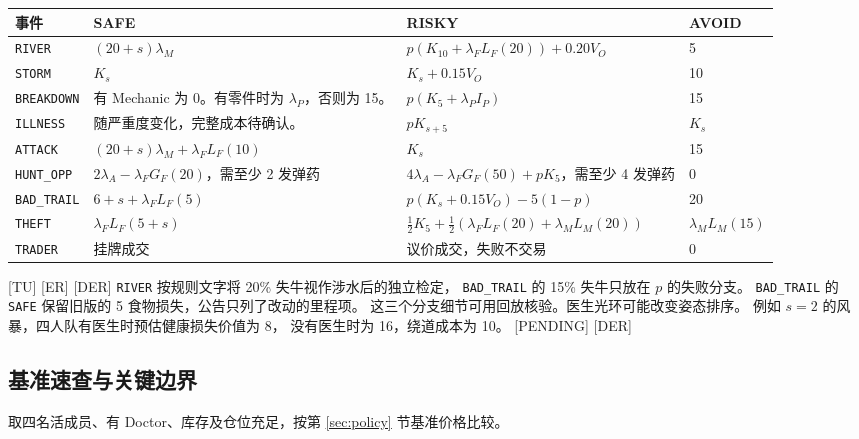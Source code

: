 \documentclass[UTF8,11pt,a4paper]{ctexart}
\newcommand{\src}[1]{\textup{\small\textcolor{muted}{[#1]}}}
\newcommand{\api}[1]{\texttt{#1}}
\newcommand{\hp}[1]{K_{#1}}
\newcommand{\fl}[1]{L_F(#1)}
\newcommand{\ml}[1]{L_M(#1)}
\newcommand{\fg}[1]{G_F(#1)}
\newcommand{\ox}{V_O}
\begin{document}
\begin{center}\small
\begin{tabularx}{\linewidth}{@{}L{2.65cm}Y Y L{2.05cm}@{}}
\toprule
事件 & SAFE & RISKY & AVOID \\
\midrule
\api{RIVER} &
  $(20+s)\lambda_M$ &
  $p(\hp{10}+\lambda_F\fl{20})+0.20\ox$ & 5 \\
\api{STORM} &
  $\hp{s}$ & $\hp{s}+0.15\ox$ & 10 \\
\api{BREAKDOWN} &
  有 Mechanic 为 0。有零件时为 $\lambda_P$，否则为 15。 &
  $p(\hp{5}+\lambda_P I_P)$ & 15 \\
\api{ILLNESS} &
  随严重度变化，完整成本待确认。 & $p\hp{s+5}$ & $\hp{s}$ \\
\api{ATTACK} &
  $(20+s)\lambda_M+\lambda_F\fl{10}$ &
  $\hp{s}$ & 15 \\
\api{HUNT\_OPP} &
  $2\lambda_A-\lambda_F\fg{20}$，需至少 2 发弹药 &
  $4\lambda_A-\lambda_F\fg{50}+p\hp{5}$，需至少 4 发弹药 & 0 \\
\api{BAD\_TRAIL} &
  $6+s+\lambda_F\fl{5}$ &
  $p(\hp{s}+0.15\ox)-5(1-p)$ & 20 \\
\api{THEFT} &
  $\lambda_F\fl{5+s}$ &
  $\tfrac12\hp{5}+\tfrac12(\lambda_F\fl{20}+\lambda_M\ml{20})$ &
  $\lambda_M\ml{15}$ \\
\api{TRADER} & 挂牌成交 & 议价成交，失败不交易 & 0 \\
\bottomrule
\end{tabularx}
\end{center}

\noindent\src{TU} \src{ER} \src{DER}
\api{RIVER} 按规则文字将 20\% 失牛视作涉水后的独立检定，
\api{BAD\_TRAIL} 的 15\% 失牛只放在 $p$ 的失败分支。
\api{BAD\_TRAIL} 的 \api{SAFE} 保留旧版的 5 食物损失，公告只列了改动的里程项。
这三个分支细节可用回放核验。医生光环可能改变姿态排序。
例如 $s=2$ 的风暴，四人队有医生时预估健康损失价值为 8，
没有医生时为 16，绕道成本为 10。 \src{PENDING} \src{DER}

\clearpage
\subsection{基准速查与关键边界}

取四名活成员、有 Doctor、库存及仓位充足，按第 \ref{sec:policy} 节基准价格比较。
\end{document}
